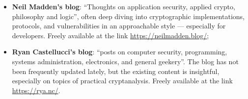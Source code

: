 \begin{itemize}
	\item \textbf{Neil Madden's blog}: ``Thoughts on application security, applied crypto, philosophy and logic'', often deep diving into cryptographic implementations, protocols, and vulnerabilities in an approachable style --- especially for developers. Freely available at the link \url{https://neilmadden.blog/};
	
	\item \textbf{Ryan Castellucci's blog}: ``posts on computer security, programming, systems administration, electronics, and general geekery''. The blog has not been frequently updated lately, but the existing content is insightful, especially on topics of practical cryptanalysis. Freely available at the link \url{https://rya.nc/}.
	
\end{itemize}

